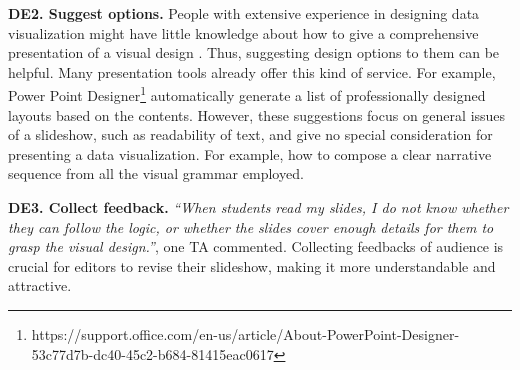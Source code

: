 \textbf{DE2. Suggest options.}
People with extensive experience in designing data visualization might have little knowledge about how to give a comprehensive presentation of a visual design . 
Thus, suggesting design options to them can be helpful. Many presentation tools already offer this kind of service. For example, Power Point Designer\footnote{https://support.office.com/en-us/article/About-PowerPoint-Designer-53c77d7b-dc40-45c2-b684-81415eac0617} automatically generate a list of professionally designed layouts based on the contents. However, these suggestions focus on general issues of a slideshow, such as readability of text, and give no special consideration for presenting a data visualization.
For example, how to compose a clear narrative sequence from all the visual grammar employed.


\textbf{DE3. Collect feedback.} \textit{``When students read my slides, I do not know whether they can follow the logic, or whether the slides cover enough details for them to grasp the visual design.''}, one TA commented. 
Collecting feedbacks of audience is crucial for editors to revise their slideshow, making it more understandable and attractive.  


